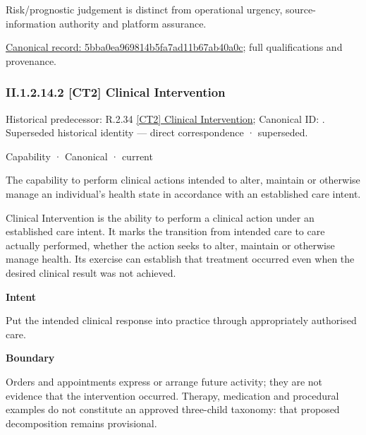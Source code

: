 Risk/prognostic judgement is distinct from operational urgency, source-information authority and platform assurance.


{\footnotesize \href{../../../../continuum/strategy/capability/5bba0ea969814b5fa7ad11b67ab40a0c.md}{Canonical record: 5bba0ea969814b5fa7ad11b67ab40a0c}; full qualifications and provenance.}\par
\subsubsection*{II.1.2.14.2 [CT2] Clinical Intervention}
\label{navigation:II.1.2.14.2}

{\small Historical predecessor: R.2.34 \hyperref[element:958345ee65f446d3b1259b8895ab100f]{[CT2] Clinical Intervention}; Canonical ID: \texttt{}. Superseded historical identity — direct correspondence · superseded.}\par
\label{element:5359d1b0ff814a0e871384469f5ebcd7}
{\small Capability · Canonical · current}\par

The capability to perform clinical actions intended to alter, maintain or otherwise manage an individual's health state in accordance with an established care intent.



Clinical Intervention is the ability to perform a clinical action under an established care intent. It marks the transition from intended care to care actually performed, whether the action seeks to alter, maintain or otherwise manage health. Its exercise can establish that treatment occurred even when the desired clinical result was not achieved.



\textbf{Intent}



Put the intended clinical response into practice through appropriately authorised care.



\textbf{Boundary}



Orders and appointments express or arrange future activity; they are not evidence that the intervention occurred. Therapy, medication and procedural examples do not constitute an approved three-child taxonomy: that proposed decomposition remains provisional.


